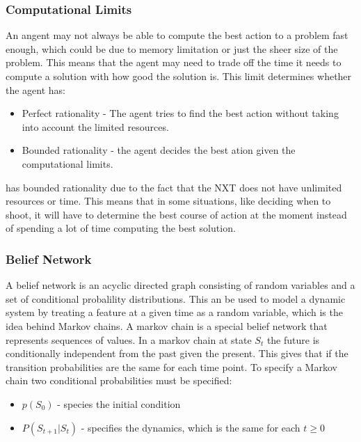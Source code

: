 

\subsubsection{Computational Limits}
An angent may not always be able to compute the best action to a problem fast
enough, which could be due to memory limitation or just the sheer size of the
problem. This means that the agent may need to trade off the time it needs to
compute a solution with how good the solution is. This limit determines whether
the agent has:

\begin{itemize}
  \item Perfect rationality - The agent tries to find the best action without
  taking into account the limited resources.
  \item Bounded rationality - the agent decides the best ation given the
  computational limits.
\end{itemize}

\namep has bounded rationality due to the fact that the NXT does not have
unlimited resources or time. This means that in some situations, like deciding
when to shoot, it will have to determine the best course of action at the
moment instead of spending a lot of time computing the best solution.

\subsubsection{Belief Network}
A belief network is an acyclic directed graph consisting of random variables and
a set of conditional probalility distributions. This an be used to model a
dynamic system by treating a feature at a given time as a random variable, which
is the idea behind Markov chains. A markov chain is a special belief network
that represents sequences of values.
In a markov chain at state $S_t$ the future is conditionally independent from
the past given the present. This gives that if the transition probabilities are
the same for each time point. To specify a Markov chain two conditional
probabilities must be specified:
\begin{itemize}
  \item $p(S_0)$ - species the initial condition
  \item $P(S_{t+1}|S_t)$ - specifies the dynamics, which is the same for each $t
  \geq 0$
\end{itemize}

